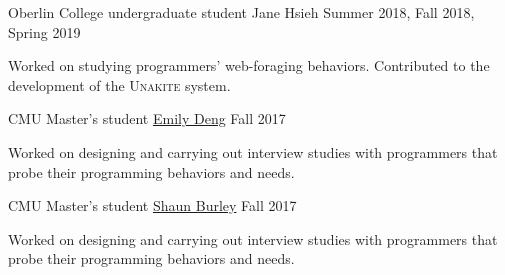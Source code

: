 
\begin{cventries}
  \cventry
    {Oberlin College undergraduate student} %
    {Jane Hsieh} %
    {Summer 2018, Fall 2018, Spring 2019} %
    {} %
    {
      \begin{cvitems} %
        \item {Worked on studying programmers' web-foraging behaviors. Contributed to the development of the \textsc{Unakite} system.}
      \end{cvitems}
    }

  \cventry
    {CMU Master's student} %
    {\href{https://emilywdeng.com/}{Emily Deng}} %
    {Fall 2017} %
    {} %
    {
      \begin{cvitems} %
        \item {Worked on designing and carrying out interview studies with programmers that probe their programming behaviors and needs.}
      \end{cvitems}
    }

  \cventry
    {CMU Master's student} %
    {\href{http://www.shaunburley.com/}{Shaun Burley}} %
    {Fall 2017} %
    {} %
    {
      \begin{cvitems} %
        \item {Worked on designing and carrying out interview studies with programmers that probe their programming behaviors and needs.}
      \end{cvitems}
    }

\end{cventries}